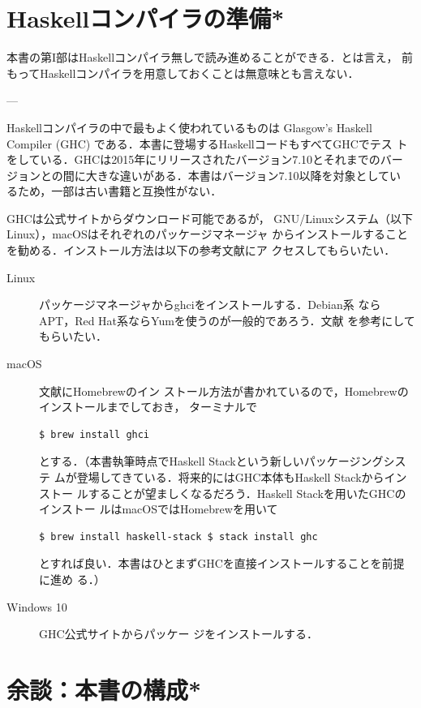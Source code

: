 \documentclass[a5paper,twoside,fleqn,draft]{jsbook}
\newcommand{\programminglanguage}[1]{\textsf{#1}}
\newcommand{\clangkr}{\programminglanguage{K\&R~C}}
\newcommand{\haskell}{\programminglanguage{Haskell}}
\newcommand{\code}[1]{\texttt{#1}}
\begin{document}


\section{\haskell コンパイラの準備*}

本書の第I部は\haskell コンパイラ無しで読み進めることができる．とは言え，
前もって\haskell コンパイラを用意しておくことは無意味とも言えない．

---

\haskell コンパイラの中で最もよく使われているものは Glasgow's Haskell
Compiler (GHC) である．本書に登場する\haskell コードもすべてGHCでテス
トをしている．GHCは2015年にリリースされたバージョン7.10とそれまでのバー
ジョンとの間に大きな違いがある．本書はバージョン7.10以降を対象としてい
るため，一部は古い書籍と互換性がない．

GHCは公式サイト\cite{haskellplatform}からダウンロード可能であるが，
GNU/Linuxシステム（以下Linux），macOSはそれぞれのパッケージマネージャ
からインストールすることを勧める．インストール方法は以下の参考文献にア
クセスしてもらいたい．
\begin{description}
\item[Linux] パッケージマネージャからghciをインストールする．Debian系
  ならAPT，Red Hat系ならYumを使うのが一般的であろう．文献\cite{linux}
  を参考にしてもらいたい．\item[macOS] 文献\cite{osx}にHomebrewのイン
  ストール方法が書かれているので，Homebrewのインストールまでしておき，
  ターミナルで
\begin{verbatim}
$ brew install ghci
\end{verbatim} %
とする．（本書執筆時点でHaskell Stackという新しいパッケージングシステ
  ムが登場してきている．将来的にはGHC本体もHaskell Stackからインストー
  ルすることが望ましくなるだろう．Haskell Stackを用いたGHCのインストー
  ルはmacOSではHomebrewを用いて
\begin{verbatim}
$ brew install haskell-stack $ stack install ghc
\end{verbatim} %
とすれば良い．本書はひとまずGHCを直接インストールすることを前提に進め
る．）\item[Windows 10] GHC公式サイト\cite{haskellplatform}からパッケー
ジをインストールする．
\end{description}


\section{余談：本書の構成*}
\end{document}
